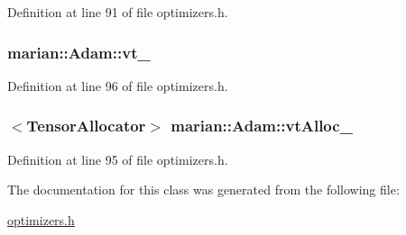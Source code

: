 Definition at line 91 of file optimizers.\+h.

\subsubsection[{\texorpdfstring{vt\+\_\+}{vt_}}]{ marian\+::\+Adam\+::vt\+\_\+\hspace{0.3cm}{\ttfamily [private]}}\hypertarget{classmarian_1_1Adam_a5c819b181f362b33c738d4ffc632c5b4}{}\label{classmarian_1_1Adam_a5c819b181f362b33c738d4ffc632c5b4}


Definition at line 96 of file optimizers.\+h.

\subsubsection[{\texorpdfstring{vt\+Alloc\+\_\+}{vtAlloc_}}]{$<${\bf Tensor\+Allocator}$>$ marian\+::\+Adam\+::vt\+Alloc\+\_\+\hspace{0.3cm}{\ttfamily [private]}}\hypertarget{classmarian_1_1Adam_a81c15958e30a106cf010d3b6e76f3b19}{}\label{classmarian_1_1Adam_a81c15958e30a106cf010d3b6e76f3b19}


Definition at line 95 of file optimizers.\+h.



The documentation for this class was generated from the following file\+:\begin{DoxyCompactItemize}
\item 
\hyperlink{optimizers_8h}{optimizers.\+h}\end{DoxyCompactItemize}
